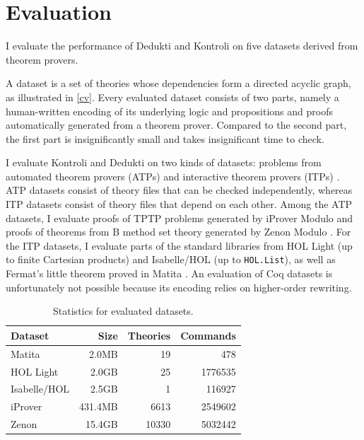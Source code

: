 \documentclass[screen,sigplan,10pt]{acmart}
\begin{document}
\hypertarget{evaluation}{%
\section{Evaluation}\label{evaluation}}

I evaluate the performance of Dedukti and Kontroli on five datasets
derived from theorem provers.

A dataset is a set of theories whose dependencies form a directed
acyclic graph, as illustrated in \autoref{cv}. Every evaluated dataset
consists of two parts, namely a human-written encoding of its underlying
logic and propositions and proofs automatically generated from a theorem
prover. Compared to the second part, the first part is insignificantly
small and takes insignificant time to check.

I evaluate Kontroli and Dedukti on two kinds of datasets: problems from
automated theorem provers (ATPs) and interactive theorem provers (ITPs)
\citep{faerber2021-koeval}. ATP datasets consist of theory files that
can be checked independently, whereas ITP datasets consist of theory
files that depend on each other. Among the ATP datasets, I evaluate
proofs of TPTP problems generated by iProver Modulo and proofs of
theorems from B method set theory generated by Zenon Modulo
\citep{DBLP:journals/jar/BurelBCDHH20}. For the ITP datasets, I evaluate
parts of the standard libraries from HOL Light (up to finite Cartesian
products) and Isabelle/HOL (up to \texttt{HOL.List}), as well as
Fermat's little theorem proved in Matita
\citep{DBLP:journals/corr/abs-1807-01873}. An evaluation of Coq datasets
is unfortunately not possible because its encoding relies on
higher-order rewriting.

\begin{table}

\caption{Statistics for evaluated datasets. \label{tab:statistics}}

\begin{tabular}{lrrr}

\toprule

Dataset & Size & Theories & Commands\tabularnewline

\midrule

Matita & 2.0MB & 19 & 478\tabularnewline
HOL Light & 2.0GB & 25 & 1776535\tabularnewline
Isabelle/HOL & 2.5GB & 1 & 116927\tabularnewline
iProver & 431.4MB & 6613 & 2549602\tabularnewline
Zenon & 15.4GB & 10330 & 5032442\tabularnewline

\bottomrule

\end{tabular}

\end{table}
\end{document}

